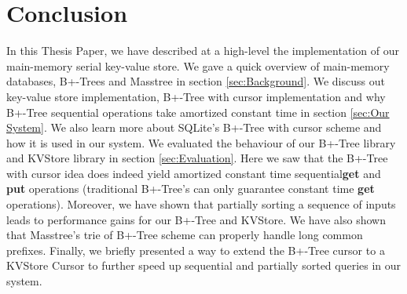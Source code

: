 \section{Conclusion}
In this Thesis Paper, we have described at a high-level the implementation of our main-memory serial key-value store. We gave a quick overview of main-memory databases, B+-Trees and Masstree in section \ref{sec:Background}. We discuss out key-value store implementation, B+-Tree with cursor implementation and why B+-Tree sequential operations take amortized constant time in section \ref{sec:Our System}. We also learn more about SQLite's \cite{SQLite} B+-Tree with cursor scheme and how it is used in our system. We evaluated the behaviour of our B+-Tree library and KVStore library in section \ref{sec:Evaluation}. Here we saw that the B+-Tree with cursor idea does indeed yield amortized constant time sequential\textbf{get} and \textbf{put} operations (traditional B+-Tree's can only guarantee constant time \textbf{get} operations). Moreover, we have shown that partially sorting a sequence of inputs leads to performance gains for our B+-Tree and KVStore. We have also shown that Masstree's trie of B+-Tree scheme can properly handle long common prefixes. Finally, we briefly presented a way to extend the B+-Tree cursor to a KVStore Cursor to further speed up sequential and partially sorted queries in our system. 
